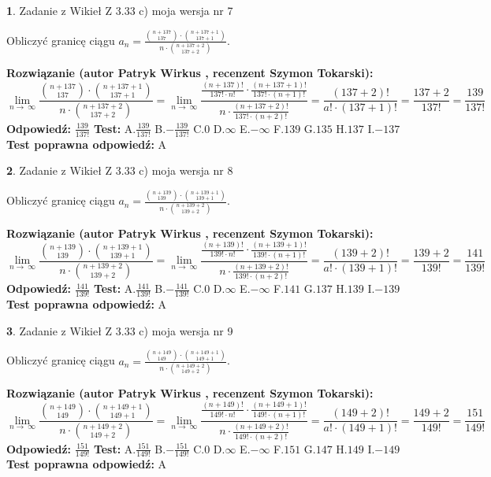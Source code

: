 \documentclass[12pt, a4paper]{article}
\theoremstyle{definition} %
\newtheorem{zad}{}
\newcommand{\zadStart}[1]{\begin{zad}#1\newline}
\newcommand{\zadStop}{\end{zad}}
\newcommand{\rozwStart}[2]{\noindent \textbf{Rozwiązanie (autor #1 , recenzent #2): }\newline}
\newcommand{\rozwStop}{\newline}
\newcommand{\odpStart}{\noindent \textbf{Odpowiedź:}\newline}
\newcommand{\odpStop}{\newline}
\newcommand{\testStart}{\noindent \textbf{Test:}\newline}
\newcommand{\testStop}{\newline}
\newcommand{\kluczStart}{\noindent \textbf{Test poprawna odpowiedź:}\newline}
\newcommand{\kluczStop}{\newline}
\begin{document}
\zadStart{Zadanie z Wikieł Z 3.33 c) moja wersja nr 7}

Obliczyć granicę ciągu $a_{n}=\frac{{n+137\choose137}\cdot{n+137+1\choose137+1}}{n\cdot{n+137+2\choose137+2}}$.
\zadStop
\rozwStart{Patryk Wirkus}{Szymon Tokarski}
$$\lim\limits_{n\to\ \infty}\frac{{n+137\choose137}\cdot{n+137+1\choose137+1}}{n\cdot{n+137+2\choose137+2}} = \lim\limits_{n\to\ \infty}\frac{\frac{(n+137)!}{137! \cdot n!}\cdot \frac{(n+137+1)!}{137! \cdot (n+1)!}}{n\cdot \frac{(n+137+2)!}{137! \cdot (n+2)!}} = \frac{(137+2)!}{a!\cdot (137+1)!} = \frac{137+2}{137!} = \frac{139}{137!}$$
\rozwStop
\odpStart
$\frac{139}{137!}$
\odpStop
\testStart
A.$\frac{139}{137!}$ B.$-\frac{139}{137!}$ C.$0$ D.$\infty$ E.$-\infty$
F.$139$ G.$135$
H.$137$
I.$-137$
\testStop
\kluczStart
A
\kluczStop



\zadStart{Zadanie z Wikieł Z 3.33 c) moja wersja nr 8}

Obliczyć granicę ciągu $a_{n}=\frac{{n+139\choose139}\cdot{n+139+1\choose139+1}}{n\cdot{n+139+2\choose139+2}}$.
\zadStop
\rozwStart{Patryk Wirkus}{Szymon Tokarski}
$$\lim\limits_{n\to\ \infty}\frac{{n+139\choose139}\cdot{n+139+1\choose139+1}}{n\cdot{n+139+2\choose139+2}} = \lim\limits_{n\to\ \infty}\frac{\frac{(n+139)!}{139! \cdot n!}\cdot \frac{(n+139+1)!}{139! \cdot (n+1)!}}{n\cdot \frac{(n+139+2)!}{139! \cdot (n+2)!}} = \frac{(139+2)!}{a!\cdot (139+1)!} = \frac{139+2}{139!} = \frac{141}{139!}$$
\rozwStop
\odpStart
$\frac{141}{139!}$
\odpStop
\testStart
A.$\frac{141}{139!}$ B.$-\frac{141}{139!}$ C.$0$ D.$\infty$ E.$-\infty$
F.$141$ G.$137$
H.$139$
I.$-139$
\testStop
\kluczStart
A
\kluczStop



\zadStart{Zadanie z Wikieł Z 3.33 c) moja wersja nr 9}

Obliczyć granicę ciągu $a_{n}=\frac{{n+149\choose149}\cdot{n+149+1\choose149+1}}{n\cdot{n+149+2\choose149+2}}$.
\zadStop
\rozwStart{Patryk Wirkus}{Szymon Tokarski}
$$\lim\limits_{n\to\ \infty}\frac{{n+149\choose149}\cdot{n+149+1\choose149+1}}{n\cdot{n+149+2\choose149+2}} = \lim\limits_{n\to\ \infty}\frac{\frac{(n+149)!}{149! \cdot n!}\cdot \frac{(n+149+1)!}{149! \cdot (n+1)!}}{n\cdot \frac{(n+149+2)!}{149! \cdot (n+2)!}} = \frac{(149+2)!}{a!\cdot (149+1)!} = \frac{149+2}{149!} = \frac{151}{149!}$$
\rozwStop
\odpStart
$\frac{151}{149!}$
\odpStop
\testStart
A.$\frac{151}{149!}$ B.$-\frac{151}{149!}$ C.$0$ D.$\infty$ E.$-\infty$
F.$151$ G.$147$
H.$149$
I.$-149$
\testStop
\kluczStart
A
\kluczStop
\end{document}
